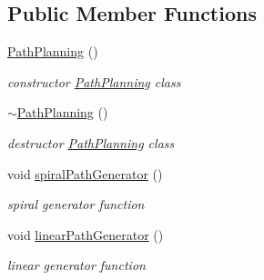 \subsection*{Public Member Functions}
\begin{DoxyCompactItemize}
\item 
\hyperlink{classPathPlanning_a314735f239a01515a3450205dd144619}{Path\+Planning} ()
\begin{DoxyCompactList}\small\item\em constructor \hyperlink{classPathPlanning}{Path\+Planning} class \end{DoxyCompactList}\item 
\hyperlink{classPathPlanning_ab1f231c8ce62aac1f2e9743aa85ba940}{$\sim$\+Path\+Planning} ()
\begin{DoxyCompactList}\small\item\em destructor \hyperlink{classPathPlanning}{Path\+Planning} class \end{DoxyCompactList}\item 
void \hyperlink{classPathPlanning_ab096aae6f4a9636d60f3acdc582a6e4a}{spiral\+Path\+Generator} ()
\begin{DoxyCompactList}\small\item\em spiral generator function \end{DoxyCompactList}\item 
void \hyperlink{classPathPlanning_ac8bdfa5f35d5819bd7981e15b95c637b}{linear\+Path\+Generator} ()
\begin{DoxyCompactList}\small\item\em linear generator function \end{DoxyCompactList}\end{DoxyCompactItemize}
